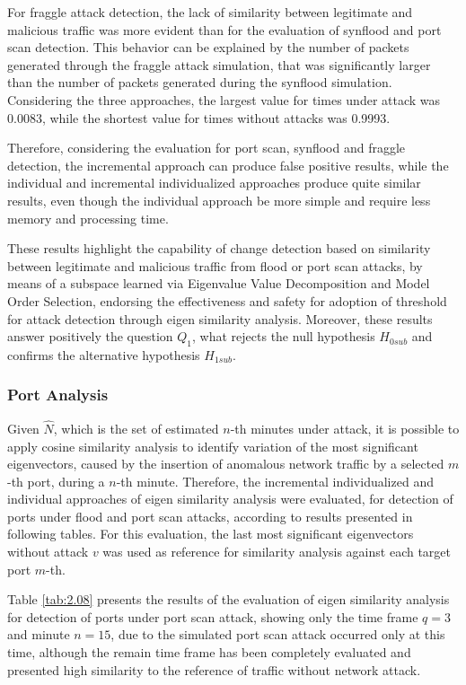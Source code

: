 For fraggle attack detection, the lack of similarity between legitimate and malicious traffic was more evident than for the evaluation of synflood and port scan detection. This behavior can be explained by the number of packets generated through the fraggle attack simulation, that was significantly larger than the number of packets generated during the synflood simulation. Considering the three approaches, the largest value for times under attack was 0.0083, while the shortest value for times without attacks was 0.9993. 

Therefore, considering the evaluation for port scan, synflood and fraggle detection, the incremental approach can produce false positive results, while the individual and incremental individualized approaches produce quite similar results, even though the individual approach be more simple and require less memory and processing time.

These results highlight the capability of change detection based on similarity between legitimate and malicious traffic from flood or port scan attacks, by means of a subspace learned via Eigenvalue Value Decomposition and Model Order Selection,
endorsing the effectiveness and safety for adoption of threshold for attack detection through eigen similarity analysis. Moreover, these results answer positively the question $Q_1$, what rejects the null hypothesis  $H_{0sub}$ and confirms the alternative
hypothesis $H_{1sub}$.

\subsubsection{Port Analysis}
\label{sec:2_PortAnalysis}

Given $\hat{N}$, which is the set of estimated $n$-th minutes under attack, it is possible to apply cosine similarity analysis to identify variation of the most significant eigenvectors, caused by the insertion of anomalous network traffic by a selected $m$-th port, during a $n$-th minute. Therefore, the incremental individualized and individual approaches of eigen similarity analysis were evaluated, for detection of ports under flood and port scan attacks, according to results presented in following tables. For this evaluation, the last most significant eigenvectors without attack $v$ was used as reference for similarity analysis against each target port $m$-th.

Table \ref{tab:2.08} presents the results of the evaluation of eigen similarity analysis for detection of ports under port scan attack, showing only the time frame $q=3$ and minute $n=15$, due to the simulated port scan attack occurred only at this time, although the remain time frame has been completely evaluated and presented high similarity to the reference of traffic without network attack.

